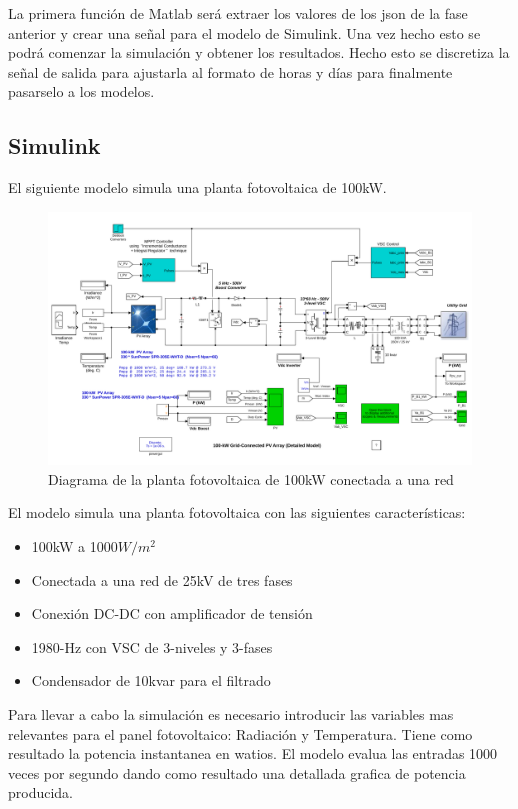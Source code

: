 La primera función de Matlab será extraer los valores de los json de la fase anterior y crear una señal para el modelo de Simulink. Una vez hecho esto se podrá comenzar la simulación y obtener los resultados. Hecho esto se discretiza la señal de salida para ajustarla al formato de horas y días para finalmente pasarselo a los modelos.


\subsection{Simulink}
\label{sub:Simulink}

El siguiente modelo simula una planta fotovoltaica de 100kW. 

\begin{figure}[h]
    \includegraphics[width=\textwidth]{Ppv_diagram.png}
    \caption{Diagrama de la planta fotovoltaica de 100kW conectada a una red}
    \label{fig:Ppv_diagram}
\end{figure}


El modelo simula una planta fotovoltaica con las siguientes características:
\begin{itemize}
    \item 100kW a 1000$W/m^2$
    \item Conectada a una red de 25kV de tres fases
    \item Conexión DC-DC con amplificador de tensión
    \item 1980-Hz con VSC de 3-niveles y 3-fases
    \item Condensador de 10kvar para el filtrado
\end{itemize}

Para llevar a cabo la simulación es necesario introducir las variables mas relevantes para el panel fotovoltaico: Radiación y Temperatura. Tiene como resultado la potencia instantanea en watios. El modelo evalua las entradas 1000 veces por segundo dando como resultado una detallada grafica de potencia producida.

